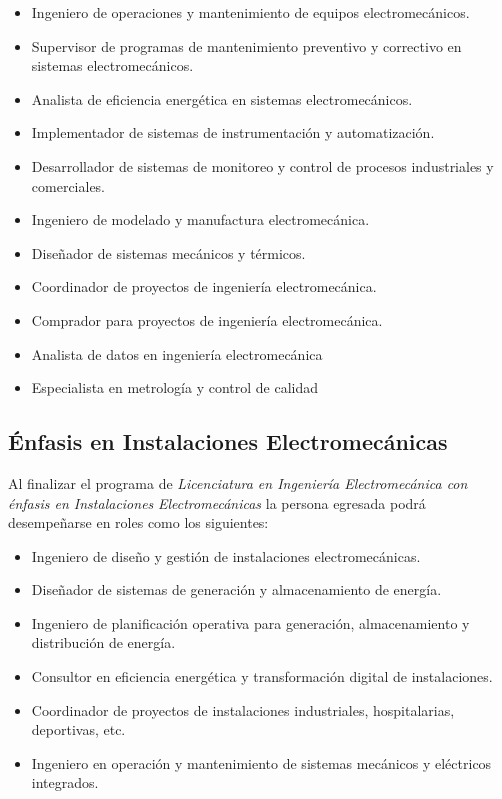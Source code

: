 \begin{itemize}
\item Ingeniero de operaciones y mantenimiento de equipos electromecánicos.
\item Supervisor de programas de mantenimiento preventivo y correctivo en sistemas electromecánicos.
\item Analista de eficiencia energética en sistemas electromecánicos.
\item Implementador de sistemas de instrumentación y automatización.
\item Desarrollador de sistemas de monitoreo y control de procesos industriales y comerciales.
\item Ingeniero de modelado y manufactura electromecánica.
\item Diseñador de sistemas mecánicos y térmicos.
\item Coordinador de proyectos de ingeniería electromecánica.
\item Comprador para proyectos de ingeniería electromecánica.
\item Analista de datos en ingeniería electromecánica
\item Especialista en metrología y control de calidad
\end{itemize}
\subsection*{Énfasis en Instalaciones Electromecánicas}

Al finalizar el programa de \textit{Licenciatura en Ingeniería Electromecánica con énfasis en Instalaciones }\textit{E}\textit{lectromecánicas}\textit{ }la persona egresada podrá desempeñarse en roles como los siguientes:\par

\begin{itemize}
\item Ingeniero de diseño y gestión de instalaciones electromecánicas.
\item Diseñador de sistemas de generación y almacenamiento de energía.
\item Ingeniero de planificación operativa para generación, almacenamiento y distribución de energía.
\item Consultor en eficiencia energética y transformación digital de instalaciones.
\item Coordinador de proyectos de instalaciones industriales, hospitalarias, deportivas, etc.
\item Ingeniero en operación y mantenimiento de sistemas mecánicos y eléctricos integrados.
\end{itemize}

